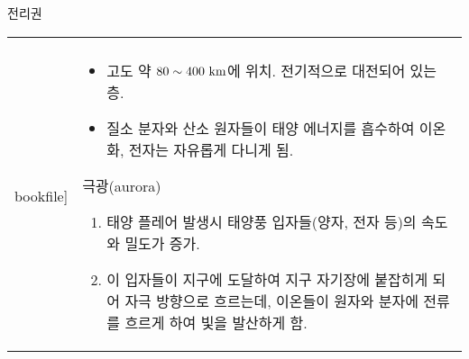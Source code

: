 \begin{frame}[t]{전리권}
	\begin{tabular}{ll}
		\begin{minipage}[t]{.50\textwidth}
			\begin{figure} 
				\texttt{[image: \\bookfile]} 
			\end{figure}
		\end{minipage}		
		&
		\begin{minipage}[t]{.450\textwidth}
			\begin{itemize} 
				\item 고도 약 $80 \sim 400 \rm{~km}$에 위치. 전기적으로 대전되어 있는 층.
				\item 질소 분자와 산소 원자들이 태양 에너지를 흡수하여 이온화, 전자는 자유롭게 다니게 됨.
			\end{itemize}
			\begin{block}{극광(aurora)}\scriptsize
				\begin{enumerate}
					\item 태양 플레어 발생시 태양풍 입자들(양자, 전자 등)의 속도와 밀도가 증가.
					\item 이 입자들이 지구에 도달하여 지구 자기장에 붙잡히게 되어 자극 방향으로 흐르는데, 이온들이 원자와 분자에 전류를 흐르게 하여 빛을 발산하게 함. 
				\end{enumerate}
			\end{block}
		\end{minipage}			
	\end{tabular}
\end{frame}




